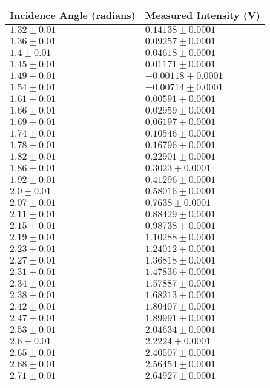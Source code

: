 \begin{tabular}{| p{} | p{} |}
\hline
Incidence Angle (radians) & Measured Intensity (V)\\
\hline
$1.32 \pm 0.01$ & $0.14138 \pm 0.0001$\\
$1.36 \pm 0.01$ & $0.09257 \pm 0.0001$\\
$1.4 \pm 0.01$ & $0.04618 \pm 0.0001$\\
$1.45 \pm 0.01$ & $0.01171 \pm 0.0001$\\
$1.49 \pm 0.01$ & $-0.00118 \pm 0.0001$\\
$1.54 \pm 0.01$ & $-0.00714 \pm 0.0001$\\
$1.61 \pm 0.01$ & $0.00591 \pm 0.0001$\\
$1.66 \pm 0.01$ & $0.02959 \pm 0.0001$\\
$1.69 \pm 0.01$ & $0.06197 \pm 0.0001$\\
$1.74 \pm 0.01$ & $0.10546 \pm 0.0001$\\
$1.78 \pm 0.01$ & $0.16796 \pm 0.0001$\\
$1.82 \pm 0.01$ & $0.22901 \pm 0.0001$\\
$1.86 \pm 0.01$ & $0.3023 \pm 0.0001$\\
$1.92 \pm 0.01$ & $0.41296 \pm 0.0001$\\
$2.0 \pm 0.01$ & $0.58016 \pm 0.0001$\\
$2.07 \pm 0.01$ & $0.7638 \pm 0.0001$\\
$2.11 \pm 0.01$ & $0.88429 \pm 0.0001$\\
$2.15 \pm 0.01$ & $0.98738 \pm 0.0001$\\
$2.19 \pm 0.01$ & $1.10288 \pm 0.0001$\\
$2.23 \pm 0.01$ & $1.24012 \pm 0.0001$\\
$2.27 \pm 0.01$ & $1.36818 \pm 0.0001$\\
$2.31 \pm 0.01$ & $1.47836 \pm 0.0001$\\
$2.34 \pm 0.01$ & $1.57887 \pm 0.0001$\\
$2.38 \pm 0.01$ & $1.68213 \pm 0.0001$\\
$2.42 \pm 0.01$ & $1.80407 \pm 0.0001$\\
$2.47 \pm 0.01$ & $1.89991 \pm 0.0001$\\
$2.53 \pm 0.01$ & $2.04634 \pm 0.0001$\\
$2.6 \pm 0.01$ & $2.2224 \pm 0.0001$\\
$2.65 \pm 0.01$ & $2.40507 \pm 0.0001$\\
$2.68 \pm 0.01$ & $2.56454 \pm 0.0001$\\
$2.71 \pm 0.01$ & $2.64927 \pm 0.0001$\\
\hline
\end{tabular}\hfill
